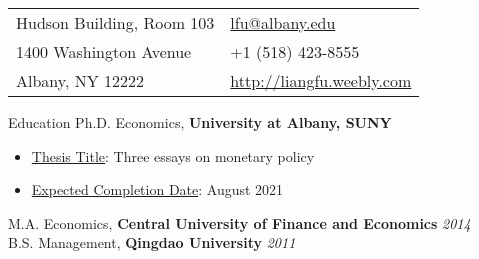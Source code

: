 \documentclass{resume_liang} %
\begin{document}
	
\begin{tabu} to \linewidth {X[l]X[r]}
	Hudson Building, Room 103     &  \href{mailto:lfu@albany.edu}{lfu@albany.edu}  \\
	1400 Washington Avenue        & +1 (518) 423-8555\\
	Albany, NY 12222              & \href{http://liangfu.weebly.com}{http://liangfu.weebly.com}
\end{tabu}
\bigskip \bigskip










\begin{rSection}{Education}
Ph.D. Economics, {\bf University at Albany, SUNY}                     
  \begin{itemize}
  	\item[] \underline{Thesis Title}: Three essays on monetary policy 
  	\item[] \underline{Expected Completion Date}: August 2021
  \end{itemize}
M.A. Economics, {\bf Central University of Finance and Economics}    \hfill {\em 2014} \\
B.S. Management, {\bf Qingdao University}                            \hfill {\em 2011} \\
\end{rSection}
\bigskip \bigskip
\end{document}
